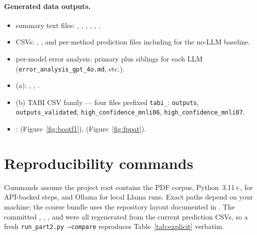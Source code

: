 \documentclass{article}
\begin{document}
\paragraph{Generated data outputs.}
\begin{itemize}
  \item {} summary text files: , , , , , .
  \item {} CSVs: , , and per-method prediction files  including  for the no-LLM baseline.
  \item {} per-model error analysis: primary  plus siblings for each LLM (\texttt{error\_analysis\_gpt\_4o.md}, etc.).
  \item {} (a): , , .
  \item {} (b) TABI CSV family --- four files prefixed \texttt{tabi\_}: \texttt{outputs}, \texttt{outputs\_validated}, \texttt{high\_confidence\_mnli06}, \texttt{high\_confidence\_mnli07}.
  \item {}:  (Figure~\ref{fig:bootf1}),  (Figure~\ref{fig:fppat}).
\end{itemize}

\appendix
\section{Reproducibility commands}
\noindent Commands assume the project root contains the PDF corpus, Python~3.11+,  for API-backed steps, and Ollama for local Llama runs. Exact paths depend on your machine; the course bundle uses the repository layout documented in . The committed , , , and  were all regenerated from the current prediction CSVs, so a fresh \texttt{run\_part2.py --compare} reproduces Table~\ref{tab:explicit} verbatim.
\end{document}

